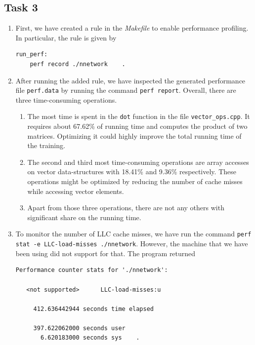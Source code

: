 \documentclass[a4paper, DIV12, headsepline]{scrartcl}
\begin{document}
\subsection*{Task 3}
\begin{enumerate}[label=(\alph*)]
\item First, we have created a rule in the \textit{Makefile} to enable performance profiling. In particular, the rule is given by
\begin{verbatim}
run_perf:
    perf record ./nnetwork    .
\end{verbatim}

\item After running the added rule, we have inspected the generated performance file \texttt{perf.data} by running the command \texttt{perf report}. Overall, there are three time-consuming operations.
\begin{enumerate}[label=(\arabic*)]
\item The most time is spent in the \texttt{dot} function in the file \texttt{vector\_ops.cpp}. It requires about 67.62\% of running time and computes the product of two matrices. Optimizing it could highly improve the total running time of the training.
\item The second and third most time-consuming operations are array accesses on vector data-structures with 18.41\% and 9.36\% respectively. These operations might be optimized by reducing the number of cache misses while accessing vector elements.
\item Apart from those three operations, there are not any others with significant share on the running time. 
\end{enumerate}

\item To monitor the number of LLC cache misses, we have run the command \texttt{perf stat -e LLC-load-misses ./nnetwork}. However, the machine that we have been using did not support for that. The program returned
\begin{verbatim}
Performance counter stats for './nnetwork':

   <not supported>      LLC-load-misses:u

     412.636442944 seconds time elapsed
     
     397.622062000 seconds user
       6.620183000 seconds sys    .
\end{verbatim}

\end{enumerate}
\end{document}
